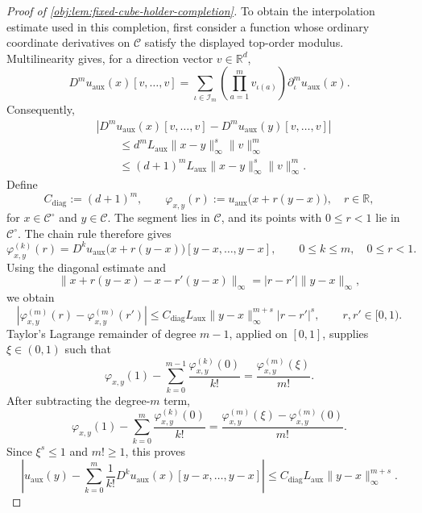 \documentclass[11pt]{article}
\begin{document}
\begin{proof}[Proof of \cref{obj:lem:fixed-cube-holder-completion}]
To obtain the interpolation estimate used in this completion, first consider a function whose ordinary coordinate derivatives on \(\mathscr C\) satisfy the displayed top-order modulus. Multilinearity gives, for a direction vector \(v\in\mathbb R^d\),
\[
D^m u_{\mathrm{aux}}(x)[v,\ldots,v]
=
\sum_{\iota\in\mathscr I_m}
\left(\prod_{a=1}^m v_{\iota(a)}\right)
\partial_\iota^m u_{\mathrm{aux}}(x).
\]
Consequently,
\[
\begin{aligned}
&|D^m u_{\mathrm{aux}}(x)[v,\ldots,v]
-D^m u_{\mathrm{aux}}(y)[v,\ldots,v]|\\
&\qquad\le
d^m L_{\mathrm{aux}}\|x-y\|_\infty^s\|v\|_\infty^m\\
&\qquad\le
(d+1)^m L_{\mathrm{aux}}\|x-y\|_\infty^s\|v\|_\infty^m.
\end{aligned}
\]
Define
\[
C_{\mathrm{diag}}:=(d+1)^m,\qquad
\varphi_{x,y}(r):=
u_{\mathrm{aux}}\bigl(x+r(y-x)\bigr),
\quad r\in\mathbb R,
\]
for \(x\in\mathscr C^\circ\) and \(y\in\mathscr C\).
The segment lies in \(\mathscr C\), and its points with \(0\le r<1\) lie in \(\mathscr C^\circ\). The chain rule therefore gives
\[
\varphi_{x,y}^{(k)}(r)
=
D^k u_{\mathrm{aux}}\bigl(x+r(y-x)\bigr)
[y-x,\ldots,y-x],
\qquad 0\le k\le m,\quad 0\le r<1.
\]
Using the diagonal estimate and
\[
\|x+r(y-x)-x-r'(y-x)\|_\infty
=
|r-r'|\|y-x\|_\infty,
\]
we obtain
\[
|\varphi_{x,y}^{(m)}(r)-\varphi_{x,y}^{(m)}(r')|
\le
C_{\mathrm{diag}}L_{\mathrm{aux}}
\|y-x\|_\infty^{m+s}|r-r'|^s,
\qquad r,r'\in[0,1).
\]
Taylor's Lagrange remainder of degree \(m-1\), applied on \([0,1]\), supplies \(\xi\in(0,1)\) such that
\[
\varphi_{x,y}(1)
-\sum_{k=0}^{m-1}\frac{\varphi_{x,y}^{(k)}(0)}{k!}
=
\frac{\varphi_{x,y}^{(m)}(\xi)}{m!}.
\]
After subtracting the degree-\(m\) term,
\[
\varphi_{x,y}(1)
-\sum_{k=0}^{m}\frac{\varphi_{x,y}^{(k)}(0)}{k!}
=
\frac{\varphi_{x,y}^{(m)}(\xi)
-\varphi_{x,y}^{(m)}(0)}{m!}.
\]
Since \(\xi^s\le1\) and \(m!\ge1\), this proves
\[
\left|
u_{\mathrm{aux}}(y)
-\sum_{k=0}^{m}\frac{1}{k!}
D^k u_{\mathrm{aux}}(x)[y-x,\ldots,y-x]
\right|
\le
C_{\mathrm{diag}}L_{\mathrm{aux}}
\|y-x\|_\infty^{m+s}.
\]


\end{proof}
\end{document}
